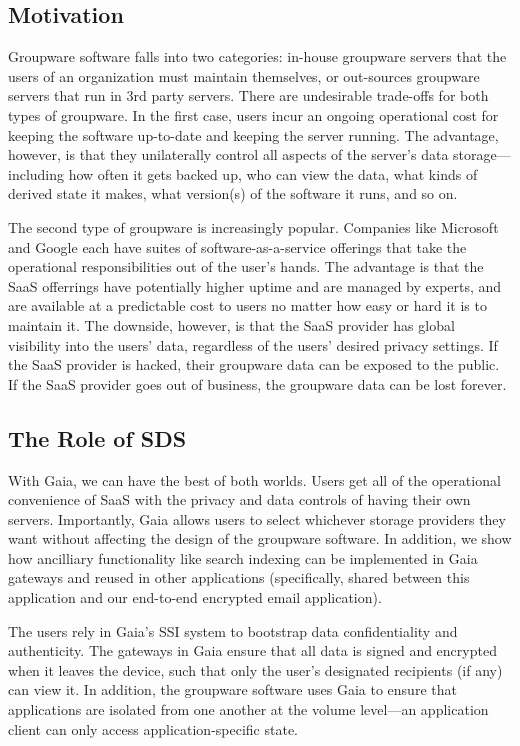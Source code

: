 \subsection{Motivation}

Groupware software falls into two categories:  in-house groupware servers that
the users of an organization must maintain themselves, or out-sources groupware
servers that run in 3rd party servers.  There are undesirable 
trade-offs for both types of groupware.  In the first case, users incur an
ongoing operational cost for keeping the software up-to-date and keeping the
server running.  The advantage, however, is that they unilaterally control all
aspects of the server's data storage---including how often it gets backed up,
who can view the data, what kinds of derived state it makes, what version(s) of
the software it runs, and so on.

The second type of groupware is increasingly popular.  Companies like Microsoft
and Google each have suites of software-as-a-service offerings that take the
operational responsibilities out of the user's hands.  The advantage is that the
SaaS offerrings have potentially higher uptime and are managed by experts, and
are available at a predictable cost to users no matter how easy or hard it is to
maintain it.  The downside, however, is that the SaaS provider has global
visibility into the users' data, regardless of the users' desired privacy
settings.  If the SaaS provider is hacked, their groupware data can be exposed
to the public.  If the SaaS provider goes out of business, the groupware data
can be lost forever.

\subsection{The Role of SDS}

With Gaia, we can have the best of both worlds.  Users get all of the
operational convenience of SaaS with the privacy and data controls of having
their own servers.  Importantly, Gaia allows users to select whichever storage
providers they want without affecting the design of the groupware software. 
In addition, we show how ancilliary functionality like search indexing can be
implemented in Gaia gateways and reused in other applications (specifically,
shared between this application and our end-to-end encrypted email application).

The users rely in Gaia's SSI system to bootstrap data confidentiality and
authenticity.  The gateways in Gaia ensure that all data is signed and encrypted
when it leaves the device, such that only the user's designated recipients (if
any) can view it.  In addition, the groupware software uses Gaia to ensure that
applications are isolated from one another at the volume level---an application
client can only access application-specific state.

